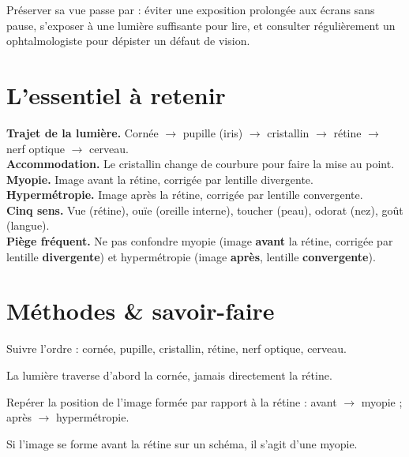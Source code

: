 \begin{propriete}
Préserver sa vue passe par : éviter une exposition prolongée aux écrans sans pause,
s'exposer à une lumière suffisante pour lire, et consulter régulièrement un
ophtalmologiste pour dépister un défaut de vision.
\end{propriete}

\section{L'essentiel à retenir}

\begin{synthese}
\textbf{Trajet de la lumière.} Cornée $\to$ pupille (iris) $\to$ cristallin $\to$
rétine $\to$ nerf optique $\to$ cerveau.\\[4pt]
\textbf{Accommodation.} Le cristallin change de courbure pour faire la mise au point.\\[4pt]
\textbf{Myopie.} Image avant la rétine, corrigée par lentille divergente.
\textbf{Hypermétropie.} Image après la rétine, corrigée par lentille convergente.\\[4pt]
\textbf{Cinq sens.} Vue (rétine), ouïe (oreille interne), toucher (peau), odorat (nez),
goût (langue).\\[4pt]
\textbf{Piège fréquent.} Ne pas confondre myopie (image \textbf{avant} la rétine, corrigée
par lentille \textbf{divergente}) et hypermétropie (image \textbf{après}, lentille
\textbf{convergente}).
\end{synthese}

\section{Méthodes \& savoir-faire}

Suivre l'ordre : cornée, pupille, cristallin, rétine, nerf optique, cerveau.
\begin{exemple}
La lumière traverse d'abord la cornée, jamais directement la rétine.
\end{exemple}

Repérer la position de l'image formée par rapport à la rétine : avant $\to$ myopie ;
après $\to$ hypermétropie.
\begin{exemple}
Si l'image se forme avant la rétine sur un schéma, il s'agit d'une myopie.
\end{exemple}

